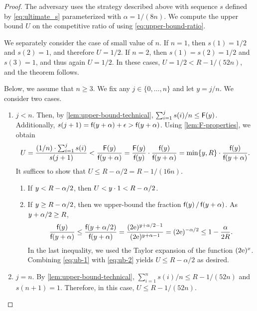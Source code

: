 \begin{proof}
The adversary uses the strategy described above
with sequence $s$ defined by \eqref{eq:ultimate_s} parameterized
with $\alpha = 1/(8n)$. We compute the upper bound $U$ on the competitive ratio
of \DET using \eqref{eq:upper-bound-ratio}.

We separately consider the case of small value of $n$.
If $n = 1$, then $s(1) = 1/2$ and $s(2) = 1$, and therefore 
$U = 1/2$. If $n = 2$, then $s(1) = s(2) = 1/2$ and $s(3) = 1$,
and thus again $U = 1/2$. In these cases, $U = 1/2 < R - 1/(52n)$, and 
the theorem follows. 

Below, we assume that $n \geq 3$.
We fix any $j \in \{0, \ldots, n\}$ and let $y = j/n$.
We consider two cases. 

\begin{enumerate}
\item $j < n$. 
Then, by \cref{lem:upper-bound-technical}, $\sum_{i=1}^j s(i)/n \leq \textsf{F}(y)$. 
Additionally, $s(j+1) = \textsf{f}(y+\alpha) + \epsilon > \textsf{f}(y + \alpha)$. 
Using \cref{lem:F-properties}, we obtain
\begin{equation}
\label{eq:ub-1}
U = \frac{ (1/n) \cdot \sum_{i = 1}^{j} s(i)}{s(j+1)}
  < \frac{\textsf{F}(y)}{\textsf{f}(y + \alpha)} 
  = \frac{\textsf{F}(y)}{\textsf{f}(y)} \cdot \frac{\textsf{f}(y)}{\textsf{f}(y + \alpha)} 
  = \min\{y, R\} \cdot \frac{\textsf{f}(y)}{\textsf{f}(y + \alpha)}.
\end{equation}
It suffices to show that $U \leq R - \alpha/2 = R - 1/(16n)$. 
\begin{enumerate}
\item If $y < R - \alpha/2$, then $U < y \cdot 1 < R - \alpha/2$.
\item If $y \geq R - \alpha/2$, then we upper-bound the fraction
$\textsf{f}(y) \,/\, \textsf{f}(y + \alpha)$. As $y + \alpha/2 \geq R$,
\begin{equation}
\label{eq:ub-2}
  \frac{\textsf{f}(y)}{\textsf{f}(y+\alpha)} 
  \leq \frac{\textsf{f}(y+\alpha/2)}{\textsf{f}(y+\alpha)} 
  = \frac{(2\mathrm{e})^{y+\alpha/2-1}}{(2\mathrm{e})^{y+\alpha-1}} 
  = (2\mathrm{e})^{-\alpha/2}
  \leq 1-\frac{\alpha}{2R}.
\end{equation}
In the last inequality, we used the Taylor expansion of the function $(2\mathrm{e})^x$.
Combining \eqref{eq:ub-1} with \eqref{eq:ub-2} yields 
$U \leq R - \alpha/2$ as desired.
\end{enumerate}

\item $j = n$.
By \cref{lem:upper-bound-technical}, 
$\sum_{i=1}^n s(i)/n \leq R - 1/(52n)$ and $s(n+1) = 1$.
Therefore, in this case, $U \leq R - 1/(52n)$.
\qedhere
\end{enumerate}
\end{proof}



